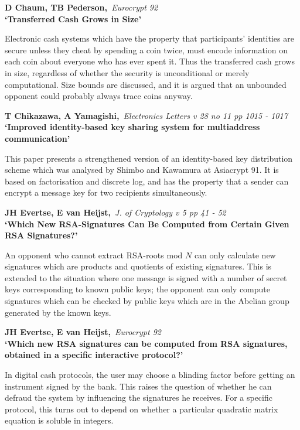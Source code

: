 {\bf \noindent D Chaum, TB Pederson,}{\em ~Eurocrypt 92\\}
{\bf `Transferred Cash Grows in Size'}

Electronic cash systems which have the property that participants' identities
are secure unless they cheat by spending a coin twice, must encode information
on each coin about everyone who has ever spent it. Thus the transferred cash 
grows in size, regardless of whether the security is unconditional or merely
computational. Size bounds are discussed, and it is argued that an unbounded 
opponent could probably always trace coins anyway.

{\bf \noindent T Chikazawa, A Yamagishi,}{\em ~Electronics Letters v 28 no 11 
pp 1015 - 1017\\}
{\bf `Improved identity-based key sharing system for multiaddress 
communication'}

This paper presents a strengthened version of an identity-based key 
distribution scheme which was analysed by Shimbo and Kawamura at Asiacrypt 91.
It is based on factorisation and discrete log, and has the property that a
sender can encrypt a message key for two recipients simultaneously.

{\bf \noindent JH Evertse, E van Heijst,}{\em ~J. of Cryptology v 5 pp 41 -
52\\}
{\bf `Which New RSA-Signatures Can Be Computed from Certain Given RSA 
Signatures?'}

An opponent who cannot extract RSA-roots mod $N$ can only calculate new
signatures which are products and quotients of existing signatures. This
is extended to the situation where one message is signed with a number of
secret keys corresponding to known public keys; the opponent can only
compute signatures which can be checked by public keys which are in the
Abelian group generated by the known keys.

{\bf \noindent JH Evertse, E van Heijst,}{\em ~Eurocrypt 92\\}
{\bf `Which new RSA signatures can be computed from RSA signatures, obtained in
a specific interactive protocol?'}

In digital cash protocols, the user may choose a blinding factor before
getting an instrument signed by the bank. This raises the question of whether
he can defraud the system by influencing the signatures he receives. For a 
specific protocol, this turns out to depend on whether a particular quadratic
matrix equation is soluble in integers.

\pagebreak

